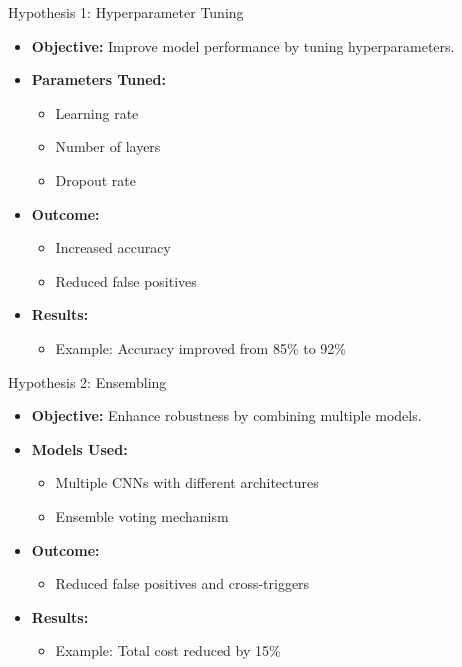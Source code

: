 \documentclass{beamer}
\begin{document}
\begin{frame}{Hypothesis 1: Hyperparameter Tuning}
  \begin{itemize}
    \item \textbf{Objective:} Improve model performance by tuning hyperparameters.
    \item \textbf{Parameters Tuned:}
      \begin{itemize}
        \item Learning rate
        \item Number of layers
        \item Dropout rate
      \end{itemize}
    \item \textbf{Outcome:}
      \begin{itemize}
        \item Increased accuracy
        \item Reduced false positives
      \end{itemize}
    \item \textbf{Results:}
      \begin{itemize}
        \item Example: Accuracy improved from 85\% to 92\%
      \end{itemize}
  \end{itemize}
\end{frame}

\begin{frame}{Hypothesis 2: Ensembling}
  \begin{itemize}
    \item \textbf{Objective:} Enhance robustness by combining multiple models.
    \item \textbf{Models Used:}
      \begin{itemize}
        \item Multiple CNNs with different architectures
        \item Ensemble voting mechanism
      \end{itemize}
    \item \textbf{Outcome:}
      \begin{itemize}
        \item Reduced false positives and cross-triggers
      \end{itemize}
    \item \textbf{Results:}
      \begin{itemize}
        \item Example: Total cost reduced by 15\%
      \end{itemize}
  \end{itemize}
\end{frame}
\end{document}
